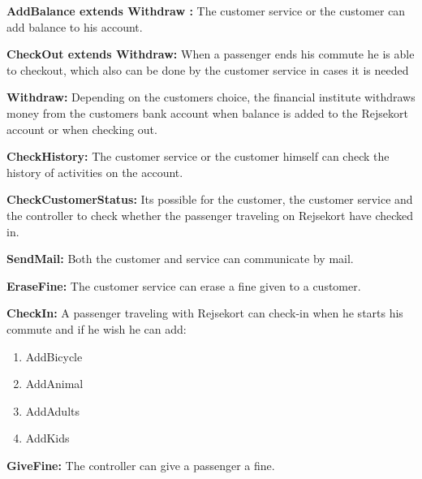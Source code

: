 \textbf{AddBalance extends Withdraw :}
The customer service or the customer can add balance to his account.

\textbf{CheckOut extends Withdraw:}
When a passenger ends his commute he is able to checkout, which also can be done by the customer service in cases it is needed

\textbf{Withdraw:}
Depending on the customers choice, the financial institute withdraws money from the customers bank account when balance is added to the Rejsekort account or when checking out.

\textbf{CheckHistory:}
The customer service or the customer himself can check the history of activities on the account.

\textbf{CheckCustomerStatus:}
Its possible for the customer, the customer service and the controller to check whether the passenger traveling on Rejsekort have checked in.

\textbf{SendMail:}
Both the customer and service can communicate by mail.

\textbf{EraseFine:}
The customer service can erase a fine given to a customer.

\textbf{CheckIn:}
A passenger traveling with Rejsekort can check-in when he starts his commute and if he wish he can add:
\begin{enumerate}
	\item AddBicycle
	\item AddAnimal
	\item AddAdults
	\item AddKids
\end{enumerate}

\textbf{GiveFine:}
The controller can give a passenger a fine.